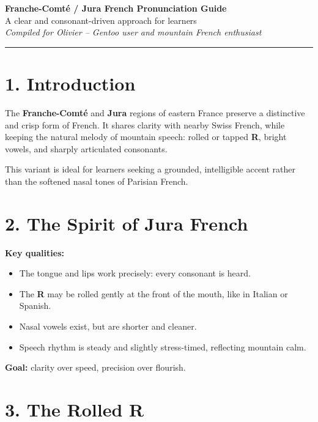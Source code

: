 \documentclass[11pt,a4paper]{article}
\begin{document}
\begin{center}
{\LARGE \textbf{Franche-Comté / Jura French Pronunciation Guide}}\\[6pt]
{\large A clear and consonant-driven approach for learners}\\[8pt]
\textit{Compiled for Olivier – Gentoo user and mountain French enthusiast}\\[1em]
\hrule
\end{center}

\vspace{1em}

\section*{1. Introduction}

The \textbf{Franche-Comté} and \textbf{Jura} regions of eastern France preserve a distinctive and crisp form of French. 
It shares clarity with nearby Swiss French, while keeping the natural melody of mountain speech: 
rolled or tapped \textbf{R}, bright vowels, and sharply articulated consonants.

This variant is ideal for learners seeking a grounded, intelligible accent rather than the softened nasal tones of Parisian French.

\vspace{0.5em}

\section*{2. The Spirit of Jura French}

\textbf{Key qualities:}
\begin{itemize}
  \item The tongue and lips work precisely: every consonant is heard.
  \item The \textbf{R} may be rolled gently at the front of the mouth, like in Italian or Spanish.
  \item Nasal vowels exist, but are shorter and cleaner.
  \item Speech rhythm is steady and slightly stress-timed, reflecting mountain calm.
\end{itemize}

\textbf{Goal:} clarity over speed, precision over flourish.

\vspace{0.5em}

\section*{3. The Rolled R}
\end{document}
